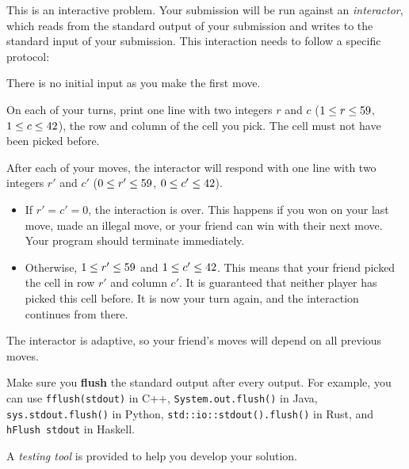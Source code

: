 \begin{Interaction}
    This is an interactive problem.
    Your submission will be run against an \emph{interactor},
    which reads from the standard output of your submission
    and writes to the standard input of your submission.
    This interaction needs to follow a specific protocol:

    There is no initial input as you make the first move.

    On each of your turns, print one line with two integers $r$ and $c$
    ($1 \le r \le 59{}$, $1 \le c \le 42{}$),
    the row and column of the cell you pick.
    The cell must not have been picked before.

    After each of your moves, the interactor will respond with one line
    with two integers $r'$ and $c'$
    ($0 \le r' \le 59{}$, $0 \le c' \le 42{}$).
    \begin{itemize}
        \item If $r' = c' = 0$, the interaction is over.
            This happens if you won on your last move, made an illegal move,
            or your friend can win with their next move.
            Your program should terminate immediately.
        \item Otherwise, $1 \le r' \le 59{}$ and $1 \le c' \le 42{}$.
            This means that your friend picked the cell in row $r'$ and column $c'$.
            It is guaranteed that neither player has picked this cell before.
            It is now your turn again, and the interaction continues from there.
    \end{itemize}

    The interactor is adaptive, so
    your friend's moves will depend on all previous moves.

    Make sure you \textbf{flush} the standard output after every output.
    For example, you can use \texttt{fflush(stdout)} in C++,
    \texttt{System.out.flush()} in Java,
    \texttt{sys.stdout.flush()} in Python,
    \texttt{std::io::stdout().flush()} in Rust,
    and \texttt{hFlush stdout} in Haskell.

    A \emph{testing tool} is provided to help you develop your solution.
\end{Interaction}
